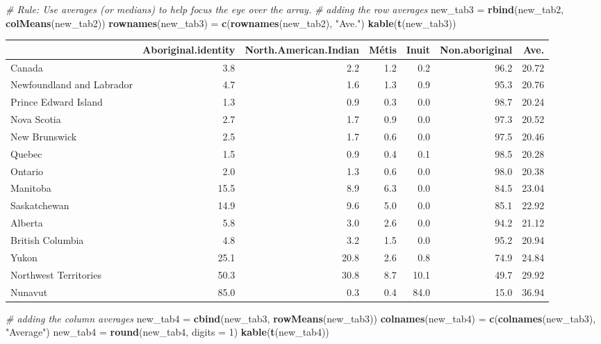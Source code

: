 \documentclass[9pt,letter]{article}
\newenvironment{Shaded}{\begin{snugshade}}{\end{snugshade}}
\newcommand{\KeywordTok}[1]{\textcolor[rgb]{0.13,0.29,0.53}{\textbf{#1}}}
\newcommand{\DataTypeTok}[1]{\textcolor[rgb]{0.13,0.29,0.53}{#1}}
\newcommand{\DecValTok}[1]{\textcolor[rgb]{0.00,0.00,0.81}{#1}}
\newcommand{\StringTok}[1]{\textcolor[rgb]{0.31,0.60,0.02}{#1}}
\newcommand{\CommentTok}[1]{\textcolor[rgb]{0.56,0.35,0.01}{\textit{#1}}}
\newcommand{\NormalTok}[1]{#1}
\begin{document}
\begin{Shaded}
\begin{Highlighting}[]
\CommentTok{# Rule: Use averages (or medians) to help focus the eye over the array.}
\CommentTok{# adding the row averages}
\NormalTok{new_tab3 =}\StringTok{ }\KeywordTok{rbind}\NormalTok{(new_tab2, }\KeywordTok{colMeans}\NormalTok{(new_tab2))}
\KeywordTok{rownames}\NormalTok{(new_tab3) =}\StringTok{ }\KeywordTok{c}\NormalTok{(}\KeywordTok{rownames}\NormalTok{(new_tab2), }\StringTok{"Ave."}\NormalTok{)}
\KeywordTok{kable}\NormalTok{(}\KeywordTok{t}\NormalTok{(new_tab3))}
\end{Highlighting}
\end{Shaded}

\begin{longtable}[]{@{}lrrrrrr@{}}
\toprule
& Aboriginal.identity & North.American.Indian & Métis & Inuit &
Non.aboriginal & Ave.\tabularnewline
\midrule
\endhead
Canada & 3.8 & 2.2 & 1.2 & 0.2 & 96.2 & 20.72\tabularnewline
Newfoundland and Labrador & 4.7 & 1.6 & 1.3 & 0.9 & 95.3 &
20.76\tabularnewline
Prince Edward Island & 1.3 & 0.9 & 0.3 & 0.0 & 98.7 &
20.24\tabularnewline
Nova Scotia & 2.7 & 1.7 & 0.9 & 0.0 & 97.3 & 20.52\tabularnewline
New Brunswick & 2.5 & 1.7 & 0.6 & 0.0 & 97.5 & 20.46\tabularnewline
Quebec & 1.5 & 0.9 & 0.4 & 0.1 & 98.5 & 20.28\tabularnewline
Ontario & 2.0 & 1.3 & 0.6 & 0.0 & 98.0 & 20.38\tabularnewline
Manitoba & 15.5 & 8.9 & 6.3 & 0.0 & 84.5 & 23.04\tabularnewline
Saskatchewan & 14.9 & 9.6 & 5.0 & 0.0 & 85.1 & 22.92\tabularnewline
Alberta & 5.8 & 3.0 & 2.6 & 0.0 & 94.2 & 21.12\tabularnewline
British Columbia & 4.8 & 3.2 & 1.5 & 0.0 & 95.2 & 20.94\tabularnewline
Yukon & 25.1 & 20.8 & 2.6 & 0.8 & 74.9 & 24.84\tabularnewline
Northwest Territories & 50.3 & 30.8 & 8.7 & 10.1 & 49.7 &
29.92\tabularnewline
Nunavut & 85.0 & 0.3 & 0.4 & 84.0 & 15.0 & 36.94\tabularnewline
\bottomrule
\end{longtable}

\begin{Shaded}
\begin{Highlighting}[]
\CommentTok{# adding the column averages}
\NormalTok{new_tab4 =}\StringTok{ }\KeywordTok{cbind}\NormalTok{(new_tab3, }\KeywordTok{rowMeans}\NormalTok{(new_tab3))}
\KeywordTok{colnames}\NormalTok{(new_tab4) =}\StringTok{ }\KeywordTok{c}\NormalTok{(}\KeywordTok{colnames}\NormalTok{(new_tab3), }\StringTok{"Average"}\NormalTok{)}
\NormalTok{new_tab4 =}\StringTok{ }\KeywordTok{round}\NormalTok{(new_tab4, }\DataTypeTok{digits =} \DecValTok{1}\NormalTok{)}
\KeywordTok{kable}\NormalTok{(}\KeywordTok{t}\NormalTok{(new_tab4))}
\end{Highlighting}
\end{Shaded}
\end{document}
